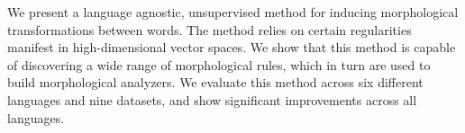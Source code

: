 We present a language agnostic, unsupervised method for inducing morphological transformations between words. The method relies on certain regularities manifest in high-dimensional vector spaces. We show that this method is capable of discovering a wide range of morphological rules, which in turn are used to build morphological analyzers. We evaluate this method across six different languages and nine datasets, and show significant improvements across all languages.
